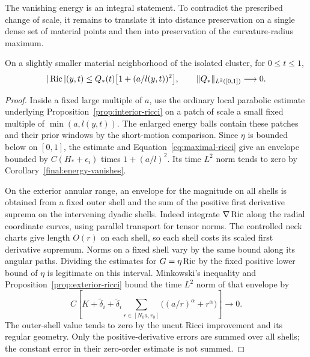 The vanishing energy is an integral statement. To contradict the
prescribed change of scale, it remains to translate it into distance
preservation on a single dense set of material points and then into
preservation of the curvature-radius maximum.
\begin{lemma}
\label{final:ricci-envelope}
On a slightly smaller material neighborhood of the isolated cluster,
for $0\le t\le1$,
\begin{equation}\label{eq:final-ricci-bound}
 |\operatorname{Ric}|(y,t)\le Q_*(t)\bigl[1+(a/l(y,t))^2\bigr],
 \qquad\|Q_*\|_{L^2([0,1])}\longrightarrow0.
\end{equation}
\end{lemma}

\begin{proof}
Inside a fixed large multiple of $a$, use the ordinary local
parabolic estimate underlying Proposition~\ref{prop:interior-ricci}
on a patch of scale a small fixed multiple of $\min(a,l(y,t))$.
The enlarged energy balls contain these patches and their prior
windows by the short-motion comparison.  Since $\eta$ is bounded
below on $[0,1]$, the estimate and
Equation~\eqref{eq:maximal-ricci} give an envelope bounded by
$C(H_*+\epsilon_i)$ times $1+(a/l)^2$.  Its time $L^2$ norm tends
to zero by Corollary~\ref{final:energy-vanishes}.

On the exterior annular range, an envelope for the magnitude on all
shells is obtained from a fixed outer shell and the sum of the
positive first derivative suprema on the intervening dyadic shells.
Indeed integrate $\nabla\operatorname{Ric}$ along the radial coordinate curves,
using parallel transport for tensor norms.  The controlled neck
charts give length $O(r)$ on each shell, so each shell costs its
scaled first derivative supremum.  Norms on a fixed shell vary by
the same bound along its angular paths.  Dividing the estimates for
$G=\eta\operatorname{Ric}$ by the fixed positive lower bound of $\eta$ is
legitimate on this interval.  Minkowski's inequality and
Proposition~\ref{prop:exterior-ricci} bound the time $L^2$ norm of
that envelope by
\[
 C\left[K+\widetilde\delta_i+
 \widetilde\delta_i\sum_{r\in[N_0a,r_0]}
                 \bigl((a/r)^\alpha+r^\alpha\bigr)\right]
 \longrightarrow0.
\]
The outer-shell value tends to zero by the uncut Ricci improvement
and its regular geometry.  Only the positive-derivative errors are
summed over all shells; the constant error in their zero-order
estimate is not summed.


\end{proof}
